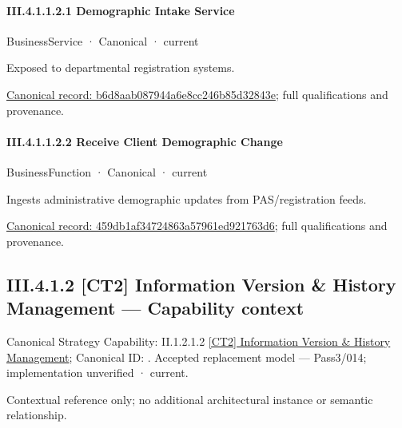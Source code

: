 \paragraph*{III.4.1.1.2.1 Demographic Intake Service}
\label{navigation:III.4.1.1.2.1}

\label{element:b6d8aab087944a6e8cc246b85d32843e}
{\small BusinessService · Canonical · current}\par

Exposed to departmental registration systems.


{\footnotesize \href{../../../../../../../../continuum/business/business-service/b6d8aab087944a6e8cc246b85d32843e.md}{Canonical record: b6d8aab087944a6e8cc246b85d32843e}; full qualifications and provenance.}\par
\paragraph*{III.4.1.1.2.2 Receive Client Demographic Change}
\label{navigation:III.4.1.1.2.2}

\label{element:459db1af34724863a57961ed921763d6}
{\small BusinessFunction · Canonical · current}\par

Ingests administrative demographic updates from PAS/registration feeds.


{\footnotesize \href{../../../../../../../../continuum/business/business-function/459db1af34724863a57961ed921763d6.md}{Canonical record: 459db1af34724863a57961ed921763d6}; full qualifications and provenance.}\par
\subsection*{III.4.1.2 [CT2] Information Version \& History Management — Capability context}
\label{navigation:III.4.1.2}

{\small Canonical Strategy Capability: II.1.2.1.2 \hyperref[element:04d00c46bd714f6688fe013f35cd1d74]{[CT2] Information Version \& History Management}; Canonical ID: \texttt{}. Accepted replacement model — Pass3/014; implementation unverified · current.}\par
Contextual reference only; no additional architectural instance or semantic relationship.\par
